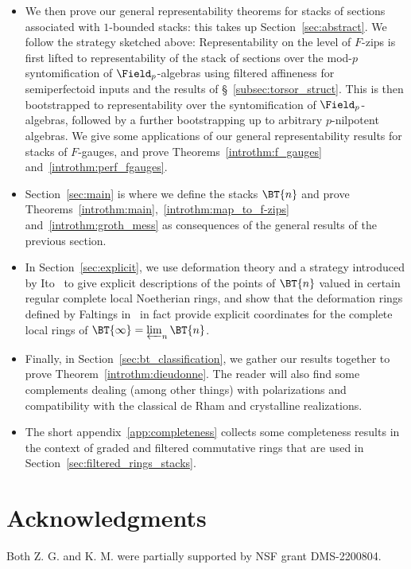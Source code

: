 \documentclass[10pt]{amsart}
\begin{document}
\begin{itemize}
   \item We then prove our general representability theorems for stacks of sections associated with $1$-bounded stacks: this takes up Section~\ref{sec:abstract}. We follow the strategy sketched above: Representability on the level of $F$-zips is first lifted to representability of the stack of sections over the mod-$p$ syntomification of $\Field_p$-algebras using filtered affineness for semiperfectoid inputs and the results of \S~\ref{subsec:torsor_struct}. This is then bootstrapped to representability over the syntomification of $\Field_p$-algebras, followed by a further bootstrapping up to arbitrary $p$-nilpotent algebras. We give some applications of our general representability results for stacks of $F$-gauges, and prove Theorems~\ref{introthm:f_gauges} and~\ref{introthm:perf_fgauges}.
   \item Section~\ref{sec:main} is where we define the stacks $\BT{n}$ and prove Theorems~\ref{introthm:main},~\ref{introthm:map_to_f-zips} and~\ref{introthm:groth_mess} as consequences of the general results of the previous section.

   \item In Section~\ref{sec:explicit}, we use deformation theory and a strategy introduced by Ito~\cite{ito2023deformation} to give explicit descriptions of the points of $\BT{n}$ valued in certain regular complete local Noetherian rings, and show that the deformation rings defined by Faltings in~\cite[\S 7]{faltings:very_ramified} in fact provide explicit coordinates for the complete local rings of $\BT{\infty} = \varprojlim_n\BT{n}$.
   \item Finally, in Section~\ref{sec:bt_classification}, we gather our results together to prove Theorem~\ref{introthm:dieudonne}. The reader will also find some complements dealing (among other things) with polarizations and compatibility with the classical de Rham and crystalline realizations.
   \item The short appendix~\ref{app:completeness} collects some completeness results in the context of graded and filtered commutative rings that are used in Section~\ref{sec:filtered_rings_stacks}.
\end{itemize}



\section*{Acknowledgments}
Both Z. G. and K. M. were partially supported by NSF grant DMS-2200804.
\end{document}
